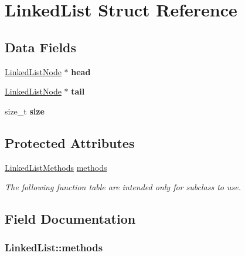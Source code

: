 \hypertarget{structLinkedList}{\section{Linked\-List Struct Reference}
\label{structLinkedList}
}
\subsection*{Data Fields}
\begin{DoxyCompactItemize}
\item 
\hypertarget{structLinkedList_ab0f2e260b7ea9b4259188fa1ed9c855f}{\hyperlink{structLinkedListNode}{Linked\-List\-Node} $\ast$ {\bfseries head}}\label{structLinkedList_ab0f2e260b7ea9b4259188fa1ed9c855f}

\item 
\hypertarget{structLinkedList_ad88e00638ee39ab681869c1ae8b685b2}{\hyperlink{structLinkedListNode}{Linked\-List\-Node} $\ast$ {\bfseries tail}}\label{structLinkedList_ad88e00638ee39ab681869c1ae8b685b2}

\item 
\hypertarget{structLinkedList_a8983298fc229caceaa6435c9c20417dc}{size\-\_\-t {\bfseries size}}\label{structLinkedList_a8983298fc229caceaa6435c9c20417dc}

\end{DoxyCompactItemize}
\subsection*{Protected Attributes}
\begin{DoxyCompactItemize}
\item 
\hyperlink{structLinkedListMethods}{Linked\-List\-Methods} \hyperlink{structLinkedList_ab6cc1736f85c5b6241908fd411d11c4b}{methods}
\begin{DoxyCompactList}\small\item\em The following function table are intended only for subclass to use. \end{DoxyCompactList}\end{DoxyCompactItemize}


\subsection{Field Documentation}
\hypertarget{structLinkedList_ab6cc1736f85c5b6241908fd411d11c4b}{
\subsubsection[{methods}]{ Linked\-List\-::methods\hspace{0.3cm}{\ttfamily [protected]}}}\label{structLinkedList_ab6cc1736f85c5b6241908fd411d11c4b}


